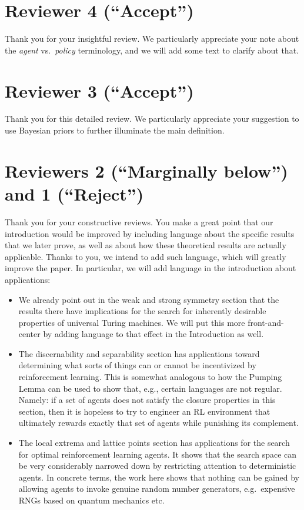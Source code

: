 \documentclass{article}
\begin{document}
\section{Reviewer 4 (``Accept'')}

Thank you for your insightful review. We particularly appreciate your note about the \emph{agent} vs.\ \emph{policy} terminology, and we will add some text to clarify about that.

\section{Reviewer 3 (``Accept'')}

Thank you for this detailed review. We particularly appreciate your suggestion to use Bayesian priors to further illuminate the main definition.

\section{Reviewers 2 (``Marginally below'') and 1 (``Reject'')}

Thank you for your constructive reviews. You make a great point that our introduction would
be improved by including language about the specific results that we later prove, as well as
about how these theoretical results are actually applicable. Thanks
to you, we intend to add such language, which will greatly improve the paper. In particular,
we will add language in the introduction about applications:
\begin{itemize}
    \item
    We already point out in the weak and strong symmetry section that the results there
    have implications for the search for inherently desirable properties of universal Turing
    machines. We will put this more front-and-center by adding language to that effect in the
    Introduction as well.
    \item
    The discernability and separability section has applications toward determining what
    sorts of things can or cannot be incentivized by reinforcement learning. This is somewhat
    analogous to how the Pumping Lemma can be used to show that, e.g., certain languages are
    not regular. Namely: if a set of agents does not satisfy the closure properties in this
    section, then it is hopeless to try to engineer an RL environment that ultimately rewards
    exactly that set of agents while punishing its complement.
    \item
    The local extrema and lattice points section has applications for the search for
    optimal reinforcement learning agents. It shows that the search space can be very
    considerably narrowed down by restricting attention to deterministic agents. In concrete
    terms, the work here shows that nothing can be gained by allowing agents to invoke
    genuine random number generators, e.g.\ expensive RNGs based on quantum mechanics etc.
\end{itemize}
\end{document}
